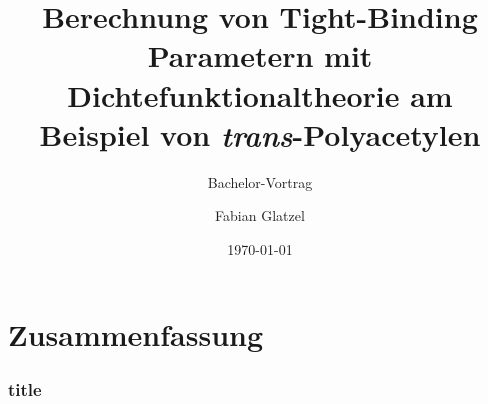 \documentclass[11pt]{beamer}
\author{Fabian Glatzel}
\title[Bachelor Vortrag]{Berechnung von Tight-Binding Parametern mit Dichtefunktionaltheorie am Beispiel von \emph{trans}-Polyacetylen}
\subtitle{Bachelor-Vortrag}
\date{\today}
\begin{document}
\begin{frame}[plain]
	\maketitle
\end{frame}

\begin{frame}
\tableofcontents
\end{frame}



\section{Zusammenfassung}
\begin{frame}
	\frametitle{title}
\end{frame}
\end{document}
